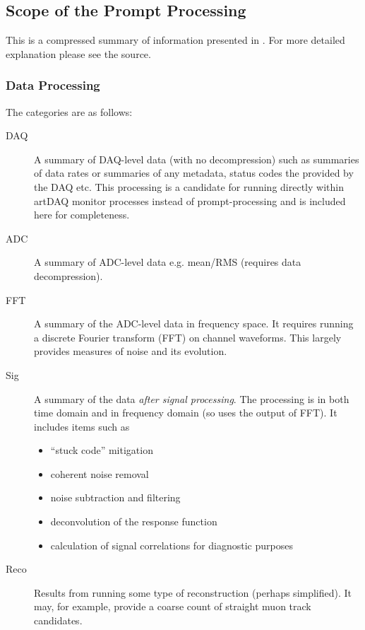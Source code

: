 \documentclass[pdftex,12pt,letter]{article}
\begin{document}
\subsection{Scope of the Prompt Processing}
This is a compressed summary of information presented in \cite{docdb1811}.
For more detailed explanation please see the source.

\subsubsection{Data Processing}
\label{sec:categories}
The categories are as follows:

\begin{description}

\item[DAQ] A summary of DAQ-level data (with no decompression) such as summaries of data
 rates  or summaries of any metadata, status codes the provided by the DAQ etc.
This processing is a candidate for running directly within artDAQ
monitor processes instead of prompt-processing and is included here
for completeness.

\item[ADC] A summary of ADC-level data e.g. mean/RMS (requires data decompression).


\item[FFT] A summary of the ADC-level data in frequency space. It requires running a discrete Fourier
transform (FFT) on channel waveforms. This largely  provides measures of noise and its
evolution.

\item[Sig] A summary of the data \textit{after signal processing}.
The processing is in  both time domain and in frequency domain (so uses the output of FFT).
It includes items such as
\begin{itemize}
\item ``stuck code'' mitigation
\item coherent noise removal
\item noise subtraction and filtering
\item deconvolution of the response function
\item calculation of signal correlations for diagnostic purposes
\end{itemize}

\item[Reco] Results from running some type of reconstruction (perhaps simplified).
It may, for  example, provide a coarse count of straight muon track candidates.

\end{description}
\end{document}
